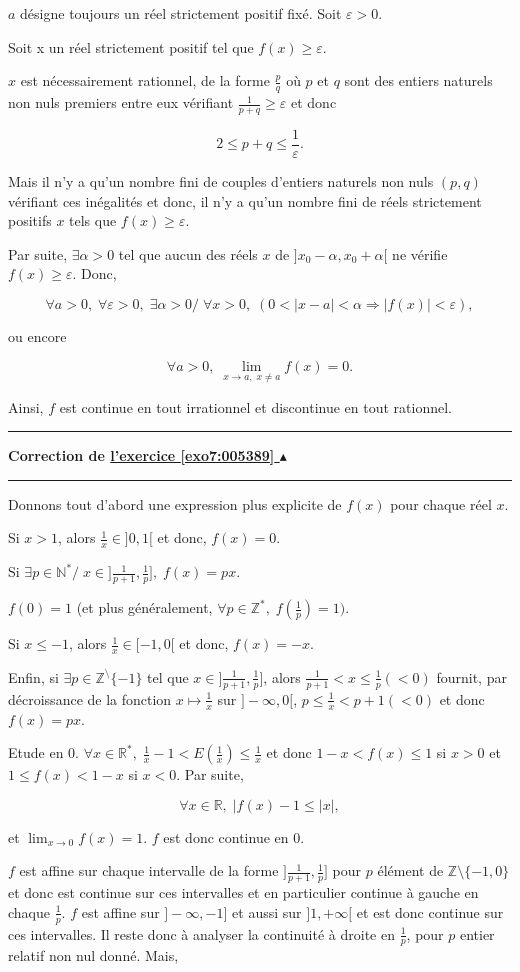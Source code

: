 \documentclass[11pt,a4paper]{article}
\newcommand{\Nn}{\mathbb{N}} \newcommand{\N}{\mathbb{N}}
\newcommand{\Zz}{\mathbb{Z}} \newcommand{\Z}{\mathbb{Z}}
\newcommand{\Rr}{\mathbb{R}} \newcommand{\R}{\mathbb{R}}
\newcounter{exo}
\newcommand{\correction}[1]{\hypertarget{cor7:#1}{}\label{cor7:#1}{\bf Correction de \hyperlink{exo7:#1}{l'exercice \ref{exo7:#1} $\blacktriangle$}}\vspace{1mm}\hrule\vspace{1mm}}
\newcommand{\fincorrection}{\vspace{1mm}\hrule\vspace*{7mm}}
\begin{document}
$a$ désigne toujours un réel strictement positif fixé. Soit $\varepsilon>0$.

Soit x un réel strictement positif tel que $f(x)\geq\varepsilon$.

$x$ est nécessairement rationnel, de la forme $\frac{p}{q}$ où $p$ et $q$ sont des entiers naturels non nuls premiers entre eux vérifiant $\frac{1}{p+q}\geq\varepsilon$ et donc 

$$2\leq p+q\leq\frac{1}{\varepsilon}.$$

Mais il n'y a qu'un nombre fini de couples d'entiers naturels non nuls $(p,q)$ vérifiant ces inégalités et donc, il n'y a qu'un nombre fini de réels strictement positifs $x$ tels que $f(x)\geq\varepsilon$.

Par suite, $\exists\alpha>0$ tel que aucun des réels $x$ de $]x_0-\alpha,x_0+\alpha[$ ne vérifie $f(x)\geq\varepsilon$. Donc, 

$$\forall a>0,\;\forall\varepsilon> 0,\;\exists\alpha>0/\;\forall x>0,\;(0<|x-a|<\alpha\Rightarrow|f(x)|<\varepsilon),$$

ou encore 

$$\forall a>0,\;\lim_{x\rightarrow a,\;x\neq a}f(x)=0.$$

Ainsi, $f$ est continue en tout irrationnel et discontinue en tout rationnel.
\fincorrection
\correction{005389}
Donnons tout d'abord une expression plus explicite de $f(x)$ pour chaque réel $x$.

Si $x>1$, alors $\frac{1}{x}\in]0,1[$ et donc, $f(x)=0$.

Si $\exists p\in\Nn^*/\;x\in]\frac{1}{p+1},\frac{1}{p}],\;f(x)=px$.

$f(0)=1$ (et plus généralement, $\forall p\in\Zz^*,\;f(\frac{1}{p})=1)$.

Si $x\leq-1$, alors $\frac{1}{x}\in[-1,0[$ et donc, $f(x)=-x$. 

Enfin, si $\exists p\in\Zz^\setminus\{-1\}$ tel que $x\in]\frac{1}{p+1},\frac{1}{p}]$, alors $\frac{1}{p+1}<x\leq\frac{1}{p}(<0)$ fournit, par décroissance de la fonction $x\mapsto\frac{1}{x}$ sur $]-\infty,0[$, $p\leq\frac{1}{x}<p+1(<0)$ et donc $f(x)=px$.

Etude en $0$. $\forall x\in\Rr^*,\;\frac{1}{x}-1<E(\frac{1}{x})\leq\frac{1}{x}$ et donc $1-x<f(x)\leq1$ si $x>0$ et $1\leq f(x)<1-x$ si $x<0$. Par suite, 

$$\forall x\in\Rr,\;|f(x)-1\leq|x|,$$

et $\lim_{x\rightarrow 0}f(x)=1$. $f$ est donc continue en $0$.

$f$ est affine sur chaque intervalle de la forme $]\frac{1}{p+1},\frac{1}{p}]$ pour $p$ élément de $\Zz\setminus\{-1,0\}$ et donc est continue sur ces intervalles et en particulier continue à gauche en chaque $\frac{1}{p}$. $f$ est affine sur $]-\infty,-1]$ et aussi sur $]1,+\infty[$ et est donc continue sur ces intervalles. Il reste donc à analyser la continuité à droite en $\frac{1}{p}$, pour $p$ entier relatif non nul donné. Mais,
\end{document}
